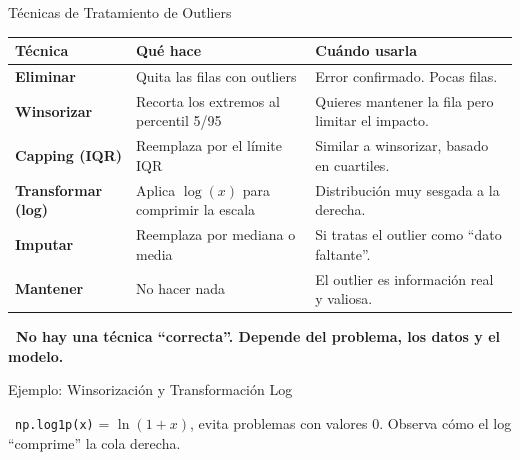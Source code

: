\documentclass[aspectratio=169, 11pt]{beamer}
\begin{document}
\begin{frame}[shrink=10]{Técnicas de Tratamiento de Outliers}
  \vspace{-4pt}
  {\small
  \renewcommand{\arraystretch}{1.3}
  \begin{tabular}{@{}p{2.8cm}p{4.5cm}p{4.5cm}@{}}
    \toprule
    \textbf{Técnica} & \textbf{Qué hace} & \textbf{Cuándo usarla} \\
    \midrule
    \textbf{Eliminar} &
      Quita las filas con outliers &
      Error confirmado. Pocas filas. \\
    \textbf{Winsorizar} &
      Recorta los extremos al percentil 5/95 &
      Quieres mantener la fila pero limitar el impacto. \\
    \textbf{Capping (IQR)} &
      Reemplaza por el límite IQR &
      Similar a winsorizar, basado en cuartiles. \\
    \textbf{Transformar (log)} &
      Aplica $\log(x)$ para comprimir la escala &
      Distribución muy sesgada a la derecha. \\
    \textbf{Imputar} &
      Reemplaza por mediana o media &
      Si tratas el outlier como ``dato faltante''. \\
    \textbf{Mantener} &
      No hacer nada &
      El outlier es información real y valiosa. \\
    \bottomrule
  \end{tabular}
  }

  \vspace{6pt}
  {\scriptsize\color{arcaDark}\bfseries
    \faArrowRight\ No hay una técnica ``correcta''. Depende del problema, los datos y el modelo.}
\end{frame}

\begin{frame}[fragile,shrink=28]{Ejemplo: Winsorización y Transformación Log}
  \vspace{-6pt}

  \vspace{4pt}
  {\scriptsize\color{textMuted}
    \faLightbulb\ \texttt{np.log1p(x)} = $\ln(1+x)$, evita problemas con valores 0.
    Observa cómo el log ``comprime'' la cola derecha.}
\end{frame}
\end{document}
